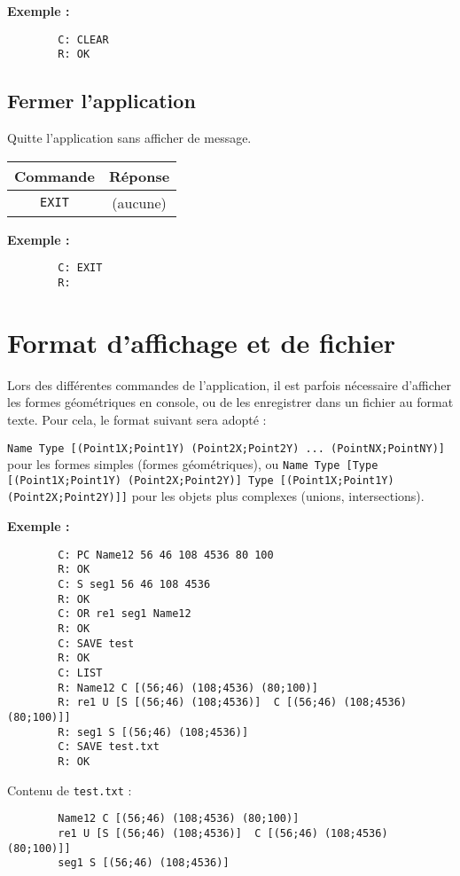 \documentclass[11pt,a4paper]{article}
\begin{document}
	\textbf{Exemple :}
	\begin{verbatim}
		C: CLEAR
		R: OK
	\end{verbatim}
	
	\subsection{Fermer l'application}
	Quitte l'application sans afficher de message.
	
	\begin{center}
		\begin{tabular}[c]{|c | c|}
			\hline
			\textbf{Commande} & \textbf{Réponse} \\
			\hline
			\texttt{EXIT} & (aucune)\\
			\hline
		\end{tabular}
	\end{center}
	
	\textbf{Exemple :}
	\begin{verbatim}
		C: EXIT
		R:
	\end{verbatim}
	
	\section{Format d’affichage et de fichier}
	Lors des différentes commandes de l’application, il est parfois nécessaire d’afficher les formes géométriques en console, ou de les enregistrer dans un fichier au format texte. Pour cela, le format suivant sera adopté :
	
	\texttt{Name Type [(Point1X;Point1Y) (Point2X;Point2Y) ... (PointNX;PointNY)]}
	pour les formes simples (formes géométriques), ou
	\texttt{Name Type [Type [(Point1X;Point1Y) (Point2X;Point2Y)] Type [(Point1X;Point1Y) (Point2X;Point2Y)]]}
	pour les objets plus complexes (unions, intersections).
	
	\textbf{Exemple :}
	\begin{verbatim}
		C: PC Name12 56 46 108 4536 80 100
		R: OK
		C: S seg1 56 46 108 4536
		R: OK
		C: OR re1 seg1 Name12
		R: OK
		C: SAVE test
		R: OK
		C: LIST
		R: Name12 C [(56;46) (108;4536) (80;100)]
		R: re1 U [S [(56;46) (108;4536)]  C [(56;46) (108;4536) (80;100)]]
		R: seg1 S [(56;46) (108;4536)]
		C: SAVE test.txt
		R: OK
	\end{verbatim}
	
	Contenu de \texttt{test.txt} :
	\begin{verbatim}
		Name12 C [(56;46) (108;4536) (80;100)]
		re1 U [S [(56;46) (108;4536)]  C [(56;46) (108;4536) (80;100)]]
		seg1 S [(56;46) (108;4536)]
	\end{verbatim}
	
\end{document}
